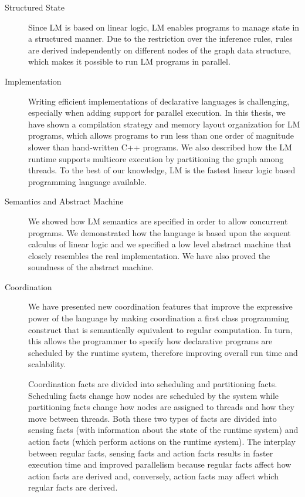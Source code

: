 \begin{description}
   \item[Structured State]

Since LM is based on linear logic, LM enables programs to manage state in a
structured manner. Due to the restriction over the inference rules, rules are
derived independently on different nodes of the graph data structure, which
makes it possible to run LM programs in parallel.

   \item[Implementation]

Writing efficient implementations of declarative languages is challenging,
especially when adding support for parallel execution. In this thesis, we have
shown a compilation strategy and memory layout organization for LM programs,
which allows programs to run less than one order of magnitude slower than
hand-written C++ programs. We also described how the LM runtime supports
multicore execution by partitioning the graph among threads. To the best of our
knowledge, LM is the fastest linear logic based programming language available.

\item[Semantics and Abstract Machine]

We showed how LM semantics are specified in order to allow concurrent
programs. We demonstrated how the language is based upon the sequent calculus of
linear logic and we specified a low level abstract machine that closely
resembles the real implementation. We have also proved the soundness of the
abstract machine.

\item[Coordination]

We have presented new coordination features that improve the expressive
power of the language by making coordination a first class programming construct
that is semantically equivalent to regular computation. In turn, this allows the
programmer to specify how declarative programs are scheduled by the runtime
system, therefore improving overall run time and scalability.

Coordination facts are divided into scheduling and partitioning facts.
Scheduling facts change how nodes are scheduled by the system while partitioning
facts change how nodes are assigned to threads and how they move between
threads. Both these two types of facts are divided into sensing facts (with
information about the state of the runtime system) and action facts (which
perform actions on the runtime system). The interplay between regular facts,
sensing facts and action facts results in faster execution time and improved
parallelism because regular facts affect how action facts are derived and,
conversely, action facts may affect which regular facts are derived.


\end{description}
